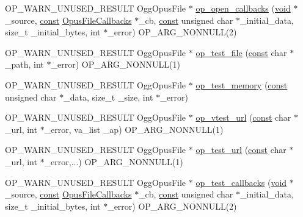 \begin{DoxyCompactItemize}
\item 
O\+P\+\_\+\+W\+A\+R\+N\+\_\+\+U\+N\+U\+S\+E\+D\+\_\+\+R\+E\+S\+U\+LT Ogg\+Opus\+File $\ast$ \hyperlink{group__stream__open__close_ga5b81c0b685f3d3c9c7d7091e5536c759}{op\+\_\+open\+\_\+callbacks} (\hyperlink{png_8h_ac9c84fa68bbad002983e35ce3663c686}{void} $\ast$\+\_\+source, \hyperlink{zconf_8h_a2c212835823e3c54a8ab6d95c652660e}{const} \hyperlink{struct_opus_file_callbacks}{Opus\+File\+Callbacks} $\ast$\+\_\+cb, \hyperlink{zconf_8h_a2c212835823e3c54a8ab6d95c652660e}{const} unsigned char $\ast$\+\_\+initial\+\_\+data, size\+\_\+t \+\_\+initial\+\_\+bytes, int $\ast$\+\_\+error) O\+P\+\_\+\+A\+R\+G\+\_\+\+N\+O\+N\+N\+U\+LL(2)
\item 
O\+P\+\_\+\+W\+A\+R\+N\+\_\+\+U\+N\+U\+S\+E\+D\+\_\+\+R\+E\+S\+U\+LT Ogg\+Opus\+File $\ast$ \hyperlink{group__stream__open__close_ga3b12533b35cd3ac0d273c1e0efa35b6f}{op\+\_\+test\+\_\+file} (\hyperlink{zconf_8h_a2c212835823e3c54a8ab6d95c652660e}{const} char $\ast$\+\_\+path, int $\ast$\+\_\+error) O\+P\+\_\+\+A\+R\+G\+\_\+\+N\+O\+N\+N\+U\+LL(1)
\item 
O\+P\+\_\+\+W\+A\+R\+N\+\_\+\+U\+N\+U\+S\+E\+D\+\_\+\+R\+E\+S\+U\+LT Ogg\+Opus\+File $\ast$ \hyperlink{group__stream__open__close_gae093e19e16871f4cb53532fe1f0c1039}{op\+\_\+test\+\_\+memory} (\hyperlink{zconf_8h_a2c212835823e3c54a8ab6d95c652660e}{const} unsigned char $\ast$\+\_\+data, size\+\_\+t \+\_\+size, int $\ast$\+\_\+error)
\item 
O\+P\+\_\+\+W\+A\+R\+N\+\_\+\+U\+N\+U\+S\+E\+D\+\_\+\+R\+E\+S\+U\+LT Ogg\+Opus\+File $\ast$ \hyperlink{group__stream__open__close_ga93b438960ec52e13e7c77446f754d016}{op\+\_\+vtest\+\_\+url} (\hyperlink{zconf_8h_a2c212835823e3c54a8ab6d95c652660e}{const} char $\ast$\+\_\+url, int $\ast$\+\_\+error, va\+\_\+list \+\_\+ap) O\+P\+\_\+\+A\+R\+G\+\_\+\+N\+O\+N\+N\+U\+LL(1)
\item 
O\+P\+\_\+\+W\+A\+R\+N\+\_\+\+U\+N\+U\+S\+E\+D\+\_\+\+R\+E\+S\+U\+LT Ogg\+Opus\+File $\ast$ \hyperlink{group__stream__open__close_ga8272aa50f50ac63b20333f0a114bb247}{op\+\_\+test\+\_\+url} (\hyperlink{zconf_8h_a2c212835823e3c54a8ab6d95c652660e}{const} char $\ast$\+\_\+url, int $\ast$\+\_\+error,...) O\+P\+\_\+\+A\+R\+G\+\_\+\+N\+O\+N\+N\+U\+LL(1)
\item 
O\+P\+\_\+\+W\+A\+R\+N\+\_\+\+U\+N\+U\+S\+E\+D\+\_\+\+R\+E\+S\+U\+LT Ogg\+Opus\+File $\ast$ \hyperlink{group__stream__open__close_gafe0e84414bbd1b511b494b5c5cef3c0f}{op\+\_\+test\+\_\+callbacks} (\hyperlink{png_8h_ac9c84fa68bbad002983e35ce3663c686}{void} $\ast$\+\_\+source, \hyperlink{zconf_8h_a2c212835823e3c54a8ab6d95c652660e}{const} \hyperlink{struct_opus_file_callbacks}{Opus\+File\+Callbacks} $\ast$\+\_\+cb, \hyperlink{zconf_8h_a2c212835823e3c54a8ab6d95c652660e}{const} unsigned char $\ast$\+\_\+initial\+\_\+data, size\+\_\+t \+\_\+initial\+\_\+bytes, int $\ast$\+\_\+error) O\+P\+\_\+\+A\+R\+G\+\_\+\+N\+O\+N\+N\+U\+LL(2)

\end{DoxyCompactItemize}
